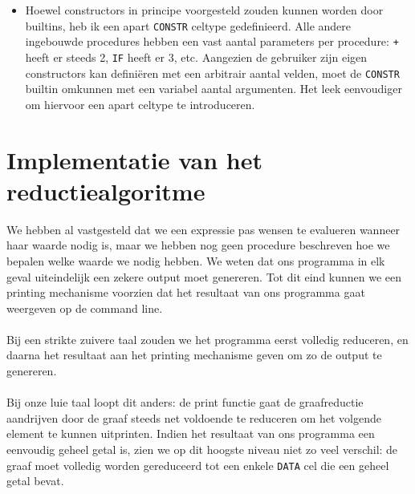 \documentclass[a4paper,10pt]{article}
\begin{document}
\begin{itemize}
  \paragraph{}
  Behalve operatoren zijn er ook enkele constanten die als builtins worden ge{\"i}mplementeerd.
  Deze kunnen gezien worden als operatoren met 0 argumenten.
  Een voorbeeld hiervan is de \texttt{FAIL} constante, die gebruikt wordt om een gefaalde poging tot pattern matching te indiceren.
\item
  Hoewel constructors in principe voorgesteld zouden kunnen worden door builtins, heb ik een apart \texttt{CONSTR} celtype gedefinieerd.
  Alle andere ingebouwde procedures hebben een vast aantal parameters per procedure: \texttt{+} heeft er steeds 2, \texttt{IF} heeft er 3, etc.
  Aangezien de gebruiker zijn eigen constructors kan defini{\"e}ren met een arbitrair aantal velden, moet de \texttt{CONSTR} builtin omkunnen met een variabel aantal argumenten.
  Het leek eenvoudiger om hiervoor een apart celtype te introduceren.
\end{itemize}

\section{Implementatie van het reductiealgoritme}
We hebben al vastgesteld dat we een expressie pas wensen te evalueren wanneer haar waarde nodig is, maar we hebben nog geen procedure beschreven hoe we bepalen welke waarde we nodig hebben.
We weten dat ons programma in elk geval uiteindelijk een zekere output moet genereren.
Tot dit eind kunnen we een printing mechanisme voorzien dat het resultaat van ons programma gaat weergeven op de command line.
\paragraph{}
Bij een strikte zuivere taal zouden we het programma eerst volledig reduceren, en daarna het resultaat aan het printing mechanisme geven om zo de output te genereren.
\paragraph{}
Bij onze luie taal loopt dit anders: de print functie gaat de graafreductie aandrijven door de graaf steeds net voldoende te reduceren om het volgende element te kunnen uitprinten.
Indien het resultaat van ons programma een eenvoudig geheel getal is, zien we op dit hoogste niveau niet zo veel verschil: de graaf moet volledig worden gereduceerd tot een enkele \texttt{DATA} cel die een geheel getal bevat.
\end{document}
